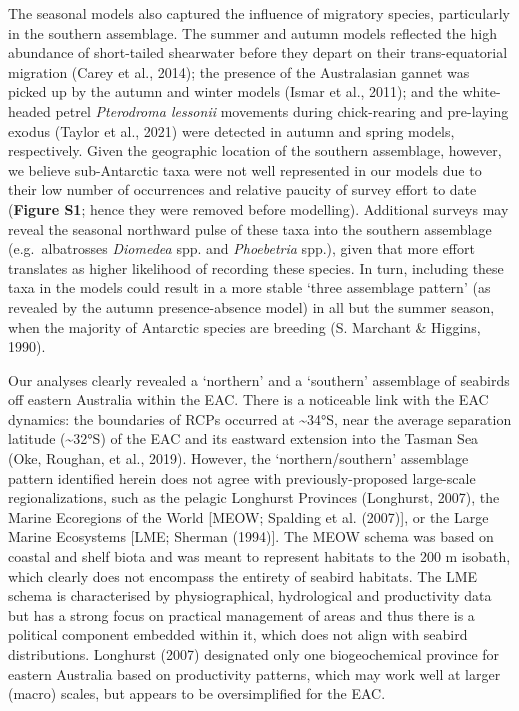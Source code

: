 \documentclass{article}
\begin{document}
The seasonal models also captured the influence of migratory species, particularly in the southern assemblage. The summer and autumn models reflected the high abundance of short-tailed shearwater before they depart on their trans-equatorial migration (Carey et al., 2014); the presence of the Australasian gannet was picked up by the autumn and winter models (Ismar et al., 2011); and the white-headed petrel \emph{Pterodroma lessonii} movements during chick-rearing and pre-laying exodus (Taylor et al., 2021) were detected in autumn and spring models, respectively. Given the geographic location of the southern assemblage, however, we believe sub-Antarctic taxa were not well represented in our models due to their low number of occurrences and relative paucity of survey effort to date (\textbf{Figure S1}; hence they were removed before modelling). Additional surveys may reveal the seasonal northward pulse of these taxa into the southern assemblage (e.g.~albatrosses \emph{Diomedea} spp. and \emph{Phoebetria} spp.), given that more effort translates as higher likelihood of recording these species. In turn, including these taxa in the models could result in a more stable `three assemblage pattern' (as revealed by the autumn presence-absence model) in all but the summer season, when the majority of Antarctic species are breeding (S. Marchant \& Higgins, 1990).

Our analyses clearly revealed a `northern' and a `southern' assemblage of seabirds off eastern Australia within the EAC. There is a noticeable link with the EAC dynamics: the boundaries of RCPs occurred at \textasciitilde34°S, near the average separation latitude (\textasciitilde32°S) of the EAC and its eastward extension into the Tasman Sea (Oke, Roughan, et al., 2019). However, the `northern/southern' assemblage pattern identified herein does not agree with previously-proposed large-scale regionalizations, such as the pelagic Longhurst Provinces (Longhurst, 2007), the Marine Ecoregions of the World {[}MEOW; Spalding et al. (2007){]}, or the Large Marine Ecosystems {[}LME; Sherman (1994){]}. The MEOW schema was based on coastal and shelf biota and was meant to represent habitats to the 200 m isobath, which clearly does not encompass the entirety of seabird habitats. The LME schema is characterised by physiographical, hydrological and productivity data but has a strong focus on practical management of areas and thus there is a political component embedded within it, which does not align with seabird distributions. Longhurst (2007) designated only one biogeochemical province for eastern Australia based on productivity patterns, which may work well at larger (macro) scales, but appears to be oversimplified for the EAC.
\end{document}
